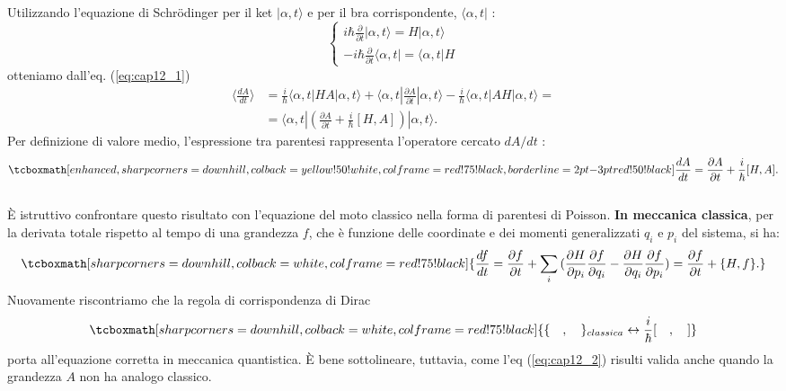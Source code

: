 Utilizzando l'equazione di Schr\"{o}dinger per il ket $|\alpha,t\rangle$ e per il bra corrispondente,   $\langle\alpha,t|$ :
	\begin{equation}
		\begin{cases}
		\displaystyle{i\hbar\frac{\partial }{\partial{t}}|\alpha,t\rangle= H|\alpha,t\rangle }\\[0.3cm]
	\displaystyle{-i\hbar\frac{\partial }{\partial{t}}\langle\alpha,t|= \langle\alpha,t|H } 
		\end{cases}
	\end{equation}
otteniamo dall'eq. (\ref{eq:cap12_1})
	\begin{align}
		\langle\frac{dA}{dt} \rangle &= \frac{i}{\hbar} \langle\alpha,t|HA|\alpha,t\rangle + \langle \alpha,t|\frac{\partial A}{\partial{t}}|\alpha,t \rangle -\frac{i}{\hbar} \langle \alpha,t|AH|\alpha,t\rangle=  \nonumber\\
		&= \langle \alpha,t| (\frac{\partial A}{\partial{t}} + \frac{i}{\hbar}[H,A] ) |\alpha,t\rangle .
	\end{align}
Per definizione di valore medio, l'espressione tra parentesi rappresenta l'operatore cercato $dA/dt$ :
	\begin{equation}
	\label{eq:cap12_2}
		\tcboxmath[enhanced, sharp corners=downhill, colback=yellow!50!white, colframe=red!75!black, borderline={2pt}{-3pt}{red!50!black}]{
			\frac{dA}{dt}= \frac{\partial A}{\partial{t}}+ \frac{i}{\hbar}[H,A].
			}
	\end{equation}\\

È istruttivo confrontare questo risultato con l'equazione del moto classico nella forma di parentesi di Poisson. \textbf{In meccanica classica}, per la derivata totale rispetto al tempo di una grandezza $f$, che è funzione delle coordinate e dei momenti generalizzati $q_i$ e $p_i$ del sistema, si ha:
	\begin{equation}
		\tcboxmath[sharp corners=downhill, colback=white, colframe=red!75!black]{
			\frac{df}{dt}= \frac{\partial f}{\partial{t}} + \sum_{i}^{}{(\frac{\partial H}{\partial{p_i}}\frac{\partial f}{\partial{q_i}} - \frac{\partial H}{\partial{q_i}}\frac{\partial f}{\partial{p_i}}} )=
\frac{\partial f}{\partial{t}}+ \{H,f\}.
			}
	\end{equation}
Nuovamente riscontriamo che la regola di corrispondenza di Dirac 
	\begin{equation}
		\tcboxmath[sharp corners=downhill, colback=white, colframe=red!75!black]{
			\{ \quad,\quad   \}_{classica}  \leftrightarrow \frac{i}{\hbar} [ \quad, \quad]
			}
	\end{equation}
porta all'equazione corretta in meccanica quantistica. È bene sottolineare, tuttavia, come l'eq (\ref{eq:cap12_2}) risulti valida anche quando la grandezza $A$ non ha analogo classico.\\

